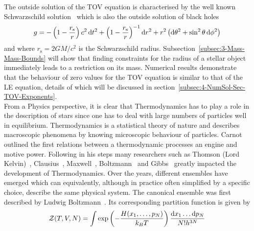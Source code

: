 The outside solution of the \ac{TOV} equation is characterised by the well known Schwarzschild solution~\cite{schwarzschildUberGravitationsfeldMassenpunktes1916} which is also the outside solution of black holes
\begin{equation}
	g=-\left(1-\frac{r_{\mathrm{s}}}{r}\right) c^{2} \mathop{}\!\mathrm{d} t^{2}+\left(1-\frac{r_{\mathrm{s}}}{r}\right)^{-1} \mathop{}\!\mathrm{d} r^{2}+r^{2}\left( \mathop{}\!\mathrm{d}\theta^2+\sin^2\theta \mathop{}\!\mathrm{d}\phi^2\right)
	\label{eq:01-Intr-Schwarzschild-Metric}
\end{equation}
and where $r_\mathrm{s}=2GM/c^2$ is the Schwarzschild radius.
Subsection~\ref{subsec:3-Mass-Mass-Bounds} will show that finding constraints for the radius of a stellar object immediately leads to a restriction on its mass.
Numerical results demonstrate that the behaviour of zero values for the \ac{TOV} equation is similar to that of the \ac{LE} equation, details of which will be discussed in section~\ref{subsec:4-NumSol-Sec-TOV-Exponents}.\\
From a Physics perspective, it is clear that Thermodynamics has to play a role in the description of stars since one has to deal with large numbers of particles well in equilibrium.
Thermodynamics is a statistical theory of nature and describes macroscopic phenomena by knowing microscopic behaviour of particles.
Carnot~\cite{carnotReflexionsPuissanceMotrice1824} outlined the first relations between a thermodynamic processes an engine and motive power.
Following in his steps many researchers such as Thomson (Lord Kelvin)~\cite{thomsonAbsoluteThermometricScale2011}, Clausius~\cite{clausiusMechanischeWaermetheorie1876}, Maxwell~\cite{maxwellScientificLettersPapers2002}, Boltzmann~\cite{boltzmannUberMechanischeBedeutung1866} and Gibbs~\cite{gibbsElementaryPrinciplesStatistical2010} greatly impacted the development of Thermodynamics.
Over the years, different ensembles have emerged which can equivalently, although in practice often simplified by a specific choice, describe the same physical system.
The canonical ensemble was first described by Ludwig Boltzmann~\cite{boltzmannUeberEigenschaftenMonocyclischer1885a}.
Its corresponding partition function is given by
\begin{equation}
	\mathcal{Z}(T,V,N) = \int\exp\left(-\frac{H(x_1,\dots,p_N)}{k_B T}\right)\frac{\mathop{}\!\mathrm{d} x_1\dots \mathop{}\!\mathrm{d} p_N}{N!h^{3N}}
	\label{eq:01-Intr-Canocnical-Ens-Part-Funct}
\end{equation}
